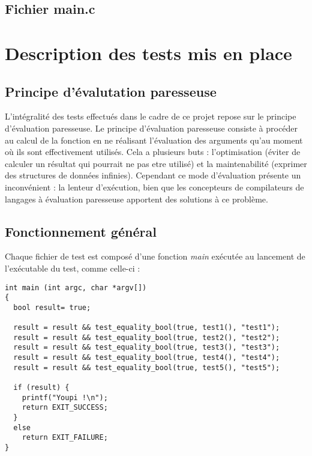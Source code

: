 \documentclass{report}
\begin{document}
\section{Fichier main.c}
\label{main}
\chapter{Description des tests mis en place}

\section{Principe d'évalutation paresseuse}
\label{Lexa}
L'intégralité des tests effectués dans le cadre de ce projet repose sur le principe d'évaluation paresseuse. Le principe d'évaluation paresseuse consiste à procéder au calcul de la fonction en ne réalisant l'évaluation des arguments qu'au moment où ils sont effectivement utilisés. Cela a plusieurs buts : l'optimisation (éviter de calculer un résultat qui pourrait ne pas etre utilisé) et la maintenabilité (exprimer des structures de données infinies). Cependant ce mode d'évaluation présente un inconvénient : la lenteur d'exécution, bien que les concepteurs de compilateurs de langages à évaluation paresseuse apportent des solutions à ce problème.

\section{Fonctionnement général}
\label{Clarke}
Chaque fichier de test est composé d'une fonction \emph{main} exécutée au lancement de l'exécutable du test, comme celle-ci :
\begin{lstlisting}
int main (int argc, char *argv[])
{
  bool result= true;

  result = result && test_equality_bool(true, test1(), "test1");
  result = result && test_equality_bool(true, test2(), "test2");
  result = result && test_equality_bool(true, test3(), "test3");
  result = result && test_equality_bool(true, test4(), "test4");
  result = result && test_equality_bool(true, test5(), "test5");

  if (result) {
    printf("Youpi !\n");
    return EXIT_SUCCESS;
  }
  else
    return EXIT_FAILURE;
}
\end{lstlisting}
\end{document}
